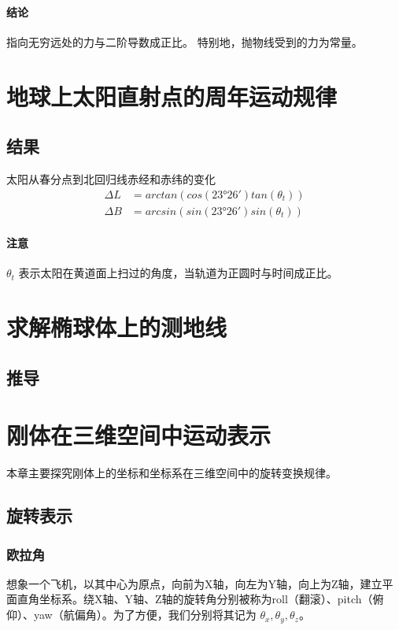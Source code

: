 \documentclass{ctexart}
\begin{document}
	\paragraph{结论}
	指向无穷远处的力与二阶导数成正比。
	特别地，抛物线受到的力为常量。
	
	
	
	\section{地球上太阳直射点的周年运动规律}
	\subsection{结果}
	太阳从春分点到北回归线赤经和赤纬的变化
	\begin{equation}
	\begin{split}
	\varDelta L &= arctan(cos(23°26') tan(\theta_t)) \\
	\varDelta B &= arcsin(sin(23°26') sin(\theta_t))
	\end{split}
	\end{equation}
	\paragraph{注意}
	$ \theta_t $ 表示太阳在黄道面上扫过的角度，当轨道为正圆时与时间成正比。
	
	
	\section{求解椭球体上的测地线}
	\subsection{推导}
	
	
	\section{刚体在三维空间中运动表示}
	本章主要探究刚体上的坐标和坐标系在三维空间中的旋转变换规律。
	\subsection{旋转表示}
	\subsubsection{欧拉角}
	想象一个飞机，以其中心为原点，向前为X轴，向左为Y轴，向上为Z轴，建立平面直角坐标系。绕X轴、Y轴、Z轴的旋转角分别被称为roll（翻滚）、pitch（俯仰）、yaw（航偏角）。为了方便，我们分别将其记为 $ \theta_x,\theta_y,\theta_z $。
\end{document}
